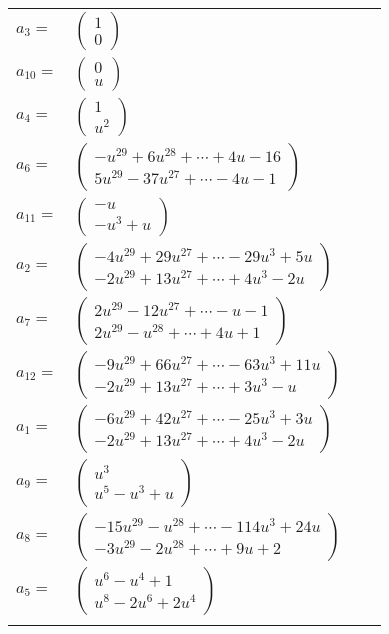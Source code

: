 \documentclass[1p]{elsarticle_modified}
\theoremstyle{definition}
\begin{document}
\begin{tabular}{m{7pt} m{180pt} m{7pt} m{180pt} }
\flushright $a_{3}=$&$\begin{pmatrix}1\\0\end{pmatrix}$ \\
\flushright $a_{10}=$&$\begin{pmatrix}0\\u\end{pmatrix}$ \\
\flushright $a_{4}=$&$\begin{pmatrix}1\\u^2\end{pmatrix}$ \\
\flushright $a_{6}=$&$\begin{pmatrix}- u^{29}+6 u^{28}+\cdots+4 u-16\\5 u^{29}-37 u^{27}+\cdots-4 u-1\end{pmatrix}$ \\
\flushright $a_{11}=$&$\begin{pmatrix}- u\\- u^3+u\end{pmatrix}$ \\
\flushright $a_{2}=$&$\begin{pmatrix}-4 u^{29}+29 u^{27}+\cdots-29 u^3+5 u\\-2 u^{29}+13 u^{27}+\cdots+4 u^3-2 u\end{pmatrix}$ \\
\flushright $a_{7}=$&$\begin{pmatrix}2 u^{29}-12 u^{27}+\cdots- u-1\\2 u^{29}- u^{28}+\cdots+4 u+1\end{pmatrix}$ \\
\flushright $a_{12}=$&$\begin{pmatrix}-9 u^{29}+66 u^{27}+\cdots-63 u^3+11 u\\-2 u^{29}+13 u^{27}+\cdots+3 u^3- u\end{pmatrix}$ \\
\flushright $a_{1}=$&$\begin{pmatrix}-6 u^{29}+42 u^{27}+\cdots-25 u^3+3 u\\-2 u^{29}+13 u^{27}+\cdots+4 u^3-2 u\end{pmatrix}$ \\
\flushright $a_{9}=$&$\begin{pmatrix}u^3\\u^5- u^3+u\end{pmatrix}$ \\
\flushright $a_{8}=$&$\begin{pmatrix}-15 u^{29}- u^{28}+\cdots-114 u^3+24 u\\-3 u^{29}-2 u^{28}+\cdots+9 u+2\end{pmatrix}$ \\
\flushright $a_{5}=$&$\begin{pmatrix}u^6- u^4+1\\u^8-2 u^6+2 u^4\end{pmatrix}$\\&\end{tabular}
\end{document}
